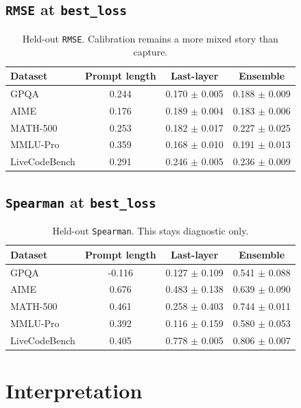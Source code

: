 \documentclass[11pt]{article}
\begin{document}
\subsection*{\texttt{RMSE} at \texttt{best\_loss}}

\begin{table}[h]
\centering
\small
\begin{tabular}{lccc}
\toprule
Dataset & Prompt length & Last-layer & Ensemble \\
\midrule
GPQA & 0.244 & 0.170 $\pm$ 0.005 & 0.188 $\pm$ 0.009 \\
AIME & 0.176 & 0.189 $\pm$ 0.004 & 0.183 $\pm$ 0.006 \\
MATH-500 & 0.253 & 0.182 $\pm$ 0.017 & 0.227 $\pm$ 0.025 \\
MMLU-Pro & 0.359 & 0.168 $\pm$ 0.010 & 0.191 $\pm$ 0.013 \\
LiveCodeBench & 0.291 & 0.246 $\pm$ 0.005 & 0.236 $\pm$ 0.009 \\
\bottomrule
\end{tabular}
\caption{Held-out \texttt{RMSE}. Calibration remains a more mixed story than capture.}
\end{table}

\subsection*{\texttt{Spearman} at \texttt{best\_loss}}

\begin{table}[h]
\centering
\small
\begin{tabular}{lccc}
\toprule
Dataset & Prompt length & Last-layer & Ensemble \\
\midrule
GPQA & -0.116 & 0.127 $\pm$ 0.109 & 0.541 $\pm$ 0.088 \\
AIME & 0.676 & 0.483 $\pm$ 0.138 & 0.639 $\pm$ 0.090 \\
MATH-500 & 0.461 & 0.258 $\pm$ 0.403 & 0.744 $\pm$ 0.011 \\
MMLU-Pro & 0.392 & 0.116 $\pm$ 0.159 & 0.580 $\pm$ 0.053 \\
LiveCodeBench & 0.405 & 0.778 $\pm$ 0.005 & 0.806 $\pm$ 0.007 \\
\bottomrule
\end{tabular}
\caption{Held-out \texttt{Spearman}. This stays diagnostic only.}
\end{table}

\section{Interpretation}
\end{document}
